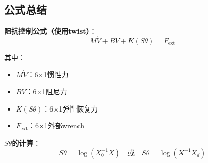 \documentclass[12pt,a4paper]{article}
\begin{document}
\subsection{公式总结}

\textbf{阻抗控制公式（使用twist）}：
\begin{equation}
M\dot{V} + BV + K(S\theta) = F_{\text{ext}}
\end{equation}

其中：
\begin{itemize}
\item $M\dot{V}$：6×1惯性力
\item $BV$：6×1阻尼力
\item $K(S\theta)$：6×1弹性恢复力
\item $F_{\text{ext}}$：6×1外部wrench
\end{itemize}

\textbf{$S\theta$的计算}：
\begin{equation}
S\theta = \log(X_0^{-1} X) \quad \text{或} \quad S\theta = \log(X^{-1} X_d)
\end{equation}
\end{document}
